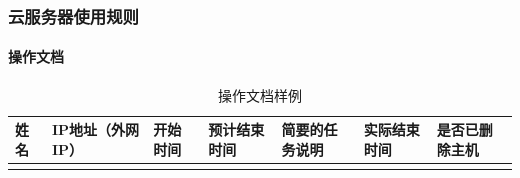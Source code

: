 \documentclass[10pt]{beamer}
\begin{document}
        \begin{frame}
            \frametitle{云服务器使用规则}
                \framesubtitle{操作文档}

                {\small
                \begin{table}[h]
                    \centering
                    \caption{操作文档样例}
                        \begin{tabular}{|p{}|p{}|p{}|p{}|p{}|p{}|p{}|}
                            \hline
                            姓名 & IP地址（外网IP） & 开始时间 & 预计结束时间 & 简要的任务说明 & 实际结束时间 & 是否已删除主机 \\
                            \hline
                            &&&&&& \\
                            \hline
                        \end{tabular}
                \end{table}
                }

        \end{frame}
\end{document}

